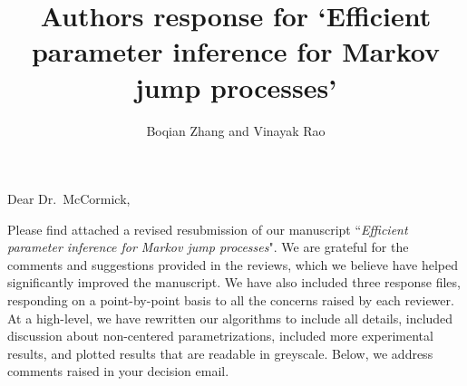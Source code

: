 \documentclass[11pt]{article}
\title{Authors response for `Efficient parameter inference for Markov jump processes'}
\author{Boqian Zhang and Vinayak Rao }
\date{}
\begin{document}
\maketitle

\noindent Dear Dr.\ McCormick,

Please find attached a revised resubmission of our manuscript ``{\em Efficient parameter inference for Markov jump processes}". 
We are grateful for the comments and suggestions provided in the reviews, which we believe have helped significantly improved the manuscript.
We have also included three response files, responding on a point-by-point basis to all the concerns raised by each reviewer. At a high-level, we have rewritten our algorithms to include all details, included discussion about non-centered parametrizations, included more experimental results, and plotted results that are readable in greyscale. 
Below, we address comments raised in your decision email.
\end{document}

